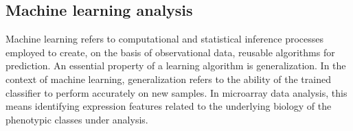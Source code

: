 



\subsection{Machine learning analysis}
\label{sec:methods-machine-learning}
Machine learning refers to computational and statistical inference processes
employed to create, on the basis of observational data, reusable algorithms for
prediction.\cite{gentleman_bioinformatics_2006} An essential property of a
learning algorithm is generalization.  In the context of machine learning,
generalization refers to the ability of the trained classifier to perform
accurately on new samples.  In microarray data analysis, this means identifying
expression features related to the underlying biology of the phenotypic classes
under analysis.

